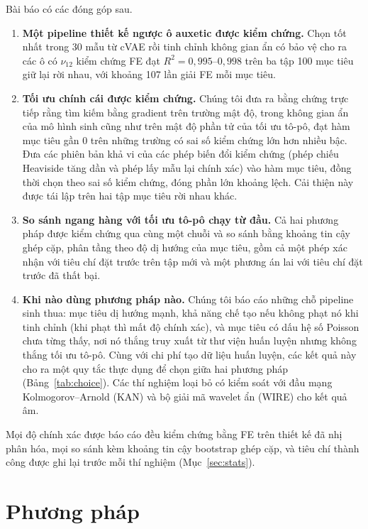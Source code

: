 \documentclass[a4paper,11pt]{article}
\newcommand{\nuot}{\nu_{12}}
\newcommand{\RR}{R^2}
\begin{document}
Bài báo có các đóng góp sau.
\begin{enumerate}
\item \textbf{Một pipeline thiết kế ngược ô auxetic được kiểm chứng.} Chọn
tốt nhất trong 30 mẫu từ cVAE rồi tinh chỉnh không gian ẩn có bảo vệ cho ra
các ô có $\nuot$ kiểm chứng FE đạt $\RR=0,995$--$0,998$ trên ba tập 100
mục tiêu giữ lại rời nhau, với khoảng 107 lần giải FE mỗi mục tiêu.
\item \textbf{Tối ưu chính cái được kiểm chứng.} Chúng tôi đưa ra bằng chứng
trực tiếp rằng tìm kiếm bằng gradient trên trường mật độ, trong không gian ẩn
của mô hình sinh cũng như trên mật độ phần tử của tối ưu tô-pô, đạt hàm mục
tiêu gần 0 trên những trường có sai số kiểm chứng lớn hơn nhiều bậc. Đưa các
phiên bản khả vi của các phép biến đổi kiểm chứng (phép chiếu Heaviside tăng
dần \citep{guest2004achieving,wang2011projection} và phép lấy mẫu lại chính
xác) vào hàm mục tiêu, đồng thời chọn theo sai số kiểm chứng, đóng phần lớn
khoảng lệch. Cải thiện này được tái lập trên hai tập mục tiêu rời nhau khác.
\item \textbf{So sánh ngang hàng với tối ưu tô-pô chạy từ đầu.} Cả hai phương
pháp được kiểm chứng qua cùng một chuỗi và so sánh bằng khoảng tin cậy ghép
cặp, phân tầng theo độ dị hướng của mục tiêu, gồm cả một phép xác nhận với
tiêu chí đặt trước trên tập mới và một phương án lai với tiêu chí đặt trước
đã thất bại.
\item \textbf{Khi nào dùng phương pháp nào.} Chúng tôi báo cáo những chỗ
pipeline sinh thua: mục tiêu dị hướng mạnh, khả năng chế tạo nếu không phạt
nó khi tinh chỉnh (khi phạt thì mất độ chính xác), và mục tiêu có
dấu hệ số Poisson chưa từng thấy, nơi nó thắng truy xuất từ thư viện huấn
luyện nhưng không thắng tối ưu tô-pô. Cùng với chi phí tạo dữ liệu huấn
luyện, các kết quả này cho ra một quy tắc thực dụng để chọn giữa hai phương
pháp (Bảng~\ref{tab:choice}). Các thí nghiệm loại bỏ có kiểm soát với đầu
mạng Kolmogorov--Arnold (KAN) và bộ giải mã wavelet ẩn (WIRE) cho kết quả âm.
\end{enumerate}

Mọi độ chính xác được báo cáo đều kiểm chứng bằng FE trên thiết kế đã nhị
phân hóa, mọi so sánh kèm khoảng tin cậy bootstrap ghép cặp, và tiêu chí
thành công được ghi lại trước mỗi thí nghiệm (Mục~\ref{sec:stats}).

\section{Phương pháp}
\end{document}
